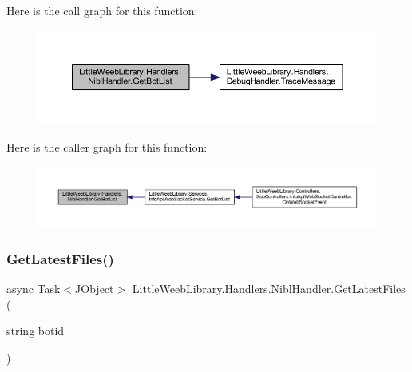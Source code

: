 Here is the call graph for this function\+:\nopagebreak
\begin{figure}[H]
\begin{center}
\leavevmode
\includegraphics[width=350pt]{class_little_weeb_library_1_1_handlers_1_1_nibl_handler_aac05976a2e1a688dd187ccca513ab3cc_cgraph}
\end{center}
\end{figure}
Here is the caller graph for this function\+:\nopagebreak
\begin{figure}[H]
\begin{center}
\leavevmode
\includegraphics[width=350pt]{class_little_weeb_library_1_1_handlers_1_1_nibl_handler_aac05976a2e1a688dd187ccca513ab3cc_icgraph}
\end{center}
\end{figure}
\mbox{\label{class_little_weeb_library_1_1_handlers_1_1_nibl_handler_a20fef31afe52976e394fc44659cc3593}} 
\subsubsection{\texorpdfstring{Get\+Latest\+Files()}{GetLatestFiles()}}
{\footnotesize\ttfamily async Task$<$J\+Object$>$ Little\+Weeb\+Library.\+Handlers.\+Nibl\+Handler.\+Get\+Latest\+Files (\begin{DoxyParamCaption}\item[{string}]{botid }\end{DoxyParamCaption})}



